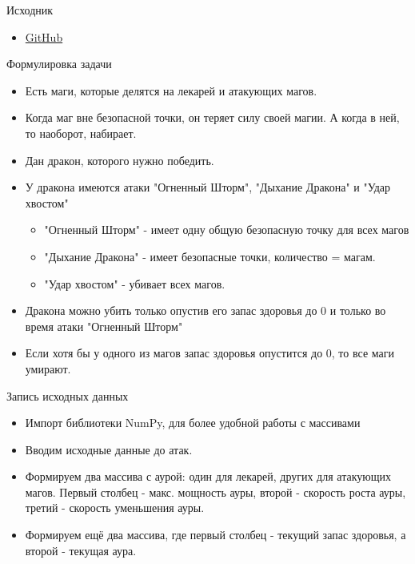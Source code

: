 \begin{frame}
    \titlepage
\end{frame}


\begin{frame}{Исходник}
\begin{itemize}
    \item \href{https://github.com/Ralendo/Kill_the_dragon}{GitHub}
\end{itemize}
\end{frame}

\begin{frame}{Формулировка задачи}
\begin{itemize}
    \item Есть маги, которые делятся на лекарей и атакующих магов.
    \item Когда маг вне безопасной точки, он теряет силу своей магии. А когда в ней, то наоборот, набирает. 
    \item Дан дракон, которого нужно победить.
    \item У дракона имеются атаки "Огненный Шторм", "Дыхание Дракона" и "Удар хвостом"
    \begin{itemize}
        \item "Огненный Шторм" - имеет одну общую безопасную точку для всех магов
        \item "Дыхание Дракона" - имеет безопасные точки, количество = магам.
        \item "Удар хвостом" - убивает всех магов.
    \end{itemize}
    \item Дракона можно убить только опустив его запас здоровья до 0 и только во время атаки "Огненный Шторм"
    \item Если хотя бы у одного из магов запас здоровья опустится до 0, то все маги умирают.
\end{itemize}
\end{frame}

\begin{frame}{Запись исходных данных}
\begin{itemize}
    \item Импорт библиотеки NumPy, для более удобной работы с массивами
    \item Вводим исходные данные до атак.
    \item Формируем два массива с аурой: один для лекарей, других для атакующих магов. Первый столбец - макс. мощность ауры, второй - скорость роста ауры, третий - скорость уменьшения ауры. 
    \item Формируем ещё два массива, где первый столбец - текущий запас здоровья, а второй - текущая аура.
\end{itemize}
\end{frame}

